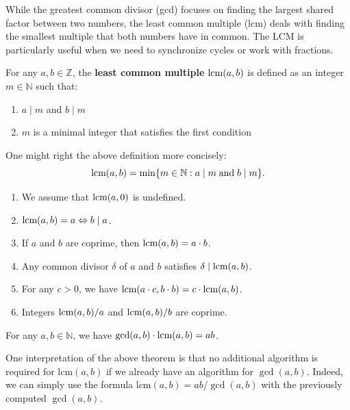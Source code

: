 \documentclass[../lecture-notes.tex]{subfiles}
\begin{document}
While the greatest common divisor (gcd) focuses on finding the largest shared factor between two numbers, the least common multiple (lcm) deals with finding the smallest multiple that both numbers have in common. The LCM is particularly useful when we need to synchronize cycles or work with fractions.

\begin{definition}[LCM]
    For any $a, b \in \mathbb{Z}$, the \textbf{least common multiple} $\text{lcm}(a,
    b)$ is defined as an integer $m \in \mathbb{N}$ such that:
    \begin{enumerate}
        \item $a \mid m$ and $b \mid m$
        \item $m$ is a minimal integer that satisfies the first condition 
    \end{enumerate}

    One might right the above definition more concisely:
    \begin{equation*}
        \text{lcm}(a,b) = \min\{m \in \mathbb{N}: a \mid m \; \text{and} \; b \mid m\}.
    \end{equation*}
\end{definition}

\begin{lemma} 
    \hfil
    \begin{enumerate}
        \item We assume that $\text{lcm}(a, 0)$ is undefined.
        \item $\text{lcm}(a, b) = a \Leftrightarrow b \mid a$.
        \item If $a$ and $b$ are coprime, then $\text{lcm}(a, b) = a \cdot b$.
        \item Any common divisor $\delta$ of $a$ and $b$ satisfies $\delta \mid \text{lcm}(a, b)$.
        \item For any $c > 0$, we have $\text{lcm}(a \cdot c, b \cdot b) =  c \cdot \text{lcm}(a, b)$.
        \item Integers $\text{lcm}(a, b)/a$ and $\text{lcm}(a, b) / b$ are coprime.
    \end{enumerate}
\end{lemma}

\begin{theorem}
    For any $a, b \in \mathbb{N}$, we have $\text{gcd}(a, b) \cdot \text{lcm}(a, b) = ab$.
\end{theorem}

One interpretation of the above theorem is that no additional algorithm is required for
$\text{lcm}(a, b)$ if we already have an algorithm for $\gcd(a, b)$. Indeed, we
can simply use the formula $\text{lcm}(a, b) = ab / \gcd(a, b)$ with the
previously computed $\gcd(a, b)$.
\end{document}
